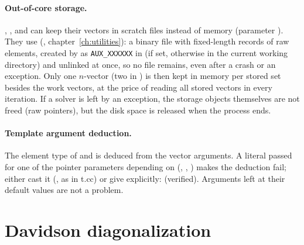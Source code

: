 \paragraph{Out-of-core storage.} , ,  and  can keep their vectors in
scratch files instead of memory (parameter ). They use  (,
chapter~\ref{ch:utilities}): a binary file with fixed-length records of raw elements, created by  as
\texttt{AUX\_XXXXXX} in  (if set, otherwise in the current working directory) and unlinked at once, so no file
remains, even after a crash or an exception. Only one $n$-vector (two in
) is then kept in memory per stored set besides the work vectors, at the price of reading all stored vectors in
every iteration. If a solver is left by an exception, the storage objects themselves are not freed (raw pointers), but the
disk space is released when the process ends.

\paragraph{Template argument deduction.} The element type  of  and  is deduced from the
vector arguments. A literal  passed for one of the pointer parameters depending on  (,
, ) makes the deduction fail; either cast it (, as in t.cc) or give
 explicitly:  (verified). Arguments left at their default values are not a
problem.

\section{Davidson diagonalization}\label{sec:iterative:davidson}


